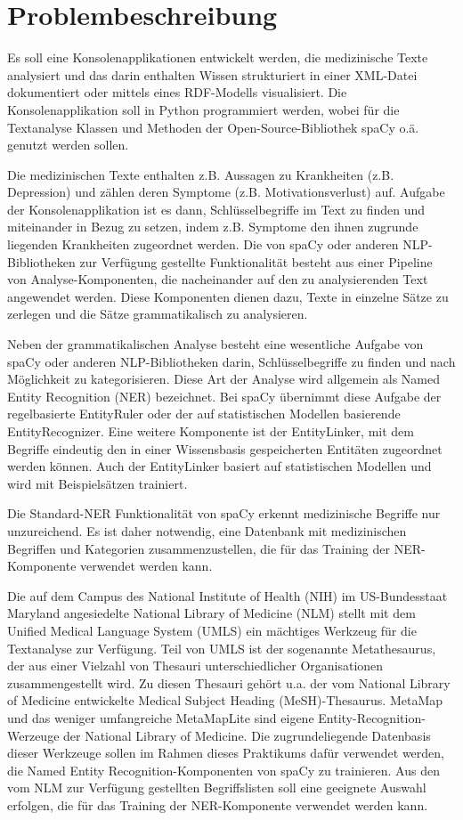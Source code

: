 \chapter{Problembeschreibung}

Es soll eine Konsolenapplikationen entwickelt werden, die medizinische Texte analysiert und das darin enthalten Wissen strukturiert in einer XML-Datei dokumentiert oder mittels eines RDF-Modells visualisiert. Die Konsolenapplikation soll in Python programmiert werden, wobei für die Textanalyse Klassen und Methoden der Open-Source-Bibliothek spaCy o.ä. genutzt werden sollen.

Die medizinischen Texte enthalten z.B. Aussagen zu Krankheiten (z.B. Depression) und zählen deren Symptome (z.B. Motivationsverlust) auf. Aufgabe der Konsolenapplikation ist es dann, Schlüsselbegriffe im Text zu finden und miteinander in Bezug zu setzen, indem z.B. Symptome den ihnen zugrunde liegenden Krankheiten zugeordnet werden. Die von spaCy oder anderen NLP-Bibliotheken zur Verfügung gestellte Funktionalität besteht aus einer Pipeline von Analyse-Komponenten, die nacheinander auf den zu analysierenden Text angewendet werden. Diese Komponenten dienen dazu, Texte in einzelne Sätze zu zerlegen und die Sätze grammatikalisch zu analysieren.

Neben der grammatikalischen Analyse besteht eine wesentliche Aufgabe von spaCy oder anderen NLP-Bibliotheken darin, Schlüsselbegriffe zu finden und nach Möglichkeit zu kategorisieren. Diese Art der Analyse wird allgemein als Named Entity Recognition (NER) bezeichnet. Bei spaCy übernimmt diese Aufgabe der regelbasierte EntityRuler oder der auf statistischen Modellen basierende EntityRecognizer. Eine weitere Komponente ist der EntityLinker, mit dem Begriffe eindeutig den in einer Wissensbasis gespeicherten Entitäten zugeordnet werden können. Auch der EntityLinker basiert auf statistischen Modellen und wird mit Beispielsätzen trainiert.

Die Standard-NER Funktionalität von spaCy erkennt medizinische Begriffe nur unzureichend. Es ist daher notwendig, eine Datenbank mit medizinischen Begriffen und Kategorien zusammenzustellen, die für das Training der NER-Komponente verwendet werden kann.

Die auf dem Campus des National Institute of Health (NIH) im US-Bun\-des\-staat Maryland angesiedelte National Library of Medicine (NLM) stellt mit dem Unified Medical Language System (UMLS) ein mächtiges Werkzeug für die Textanalyse zur Verfügung. Teil von UMLS ist der sogenannte Metathesaurus, der aus einer Vielzahl von Thesauri unterschiedlicher Organisationen zusammengestellt wird. Zu diesen Thesauri gehört u.a. der vom National Library of Medicine entwickelte Medical Subject Heading (MeSH)-Thesaurus. MetaMap und das weniger umfangreiche MetaMapLite sind eigene Entity-Recognition-Werzeuge der National Library of Medicine. Die zugrundeliegende Datenbasis dieser Werkzeuge sollen im Rahmen dieses Praktikums dafür verwendet werden, die Named Entity Recognition-Komponenten von spaCy zu trainieren. Aus den vom NLM zur Verfügung gestellten Begriffslisten soll eine geeignete Auswahl erfolgen, die für das Training der NER-Komponente verwendet werden kann.

